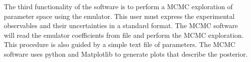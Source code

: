 \documentclass[12pt]{article}
\numberwithin{equation}{section}
\numberwithin{figure}{section}
\begin{document}
The third functionality of the software is to perform a MCMC exploration of parameter space using the emulator. This user must express the experimental observables and their uncertainties in a standard format. The MCMC software will read the emulator coefficients from file and perform the MCMC exploration. This procedure is also guided by a simple text file of parameters. The MCMC software uses python and Matplotlib to generate plots that describe the posterior. 


\newpage



\newpage



\newpage



\newpage



\newpage



\newpage



\newpage



\newpage


\end{document}
